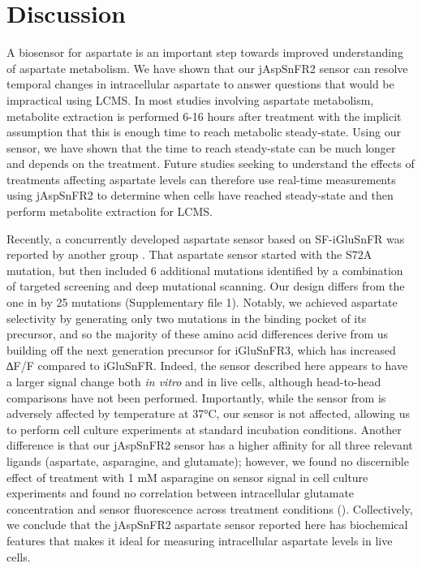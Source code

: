 \documentclass[9pt,lineno]{elife}
\begin{document}
\section{Discussion}
A biosensor for aspartate is an important step towards improved understanding of aspartate metabolism.
We have shown that our jAspSnFR2 sensor can resolve temporal changes in intracellular aspartate to answer questions that would be impractical using LCMS.
In most studies involving aspartate metabolism, metabolite extraction is performed 6-16 hours after treatment with the implicit assumption that this is enough time to reach metabolic steady-state.
Using our sensor, we have shown that the time to reach steady-state can be much longer and depends on the treatment.
Future studies seeking to understand the effects of treatments affecting aspartate levels can therefore use real-time measurements using jAspSnFR2 to determine when cells have reached steady-state and then perform metabolite extraction for LCMS.

Recently, a concurrently developed aspartate sensor based on SF-iGluSnFR was reported by another group \citep{Hellweg2023}.
That aspartate sensor started with the S72A mutation, but then included 6 additional mutations identified by a combination of targeted screening and deep mutational scanning.
Our design differs from the one in \cite{Hellweg2023} by 25 mutations (Supplementary file 1).
Notably, we achieved aspartate selectivity by generating only two mutations in the binding pocket of its precursor, and so the majority of these amino acid differences derive from us building off the next generation precursor for iGluSnFR3, which has increased ∆F/F compared to iGluSnFR.
Indeed, the sensor described here appears to have a larger signal change both \textit{in vitro} and in live cells, although head-to-head comparisons have not been performed.
Importantly, while the sensor from \cite{Hellweg2023} is adversely affected by temperature at 37°C, our sensor is not affected, allowing us to perform cell culture experiments at standard incubation conditions.
Another difference is that our jAspSnFR2 sensor has a higher affinity for all three relevant ligands (aspartate, asparagine, and glutamate); however, we found no discernible effect of treatment with 1 mM asparagine on sensor signal in cell culture experiments and found no correlation between intracellular glutamate concentration and sensor fluorescence across treatment conditions ().
Collectively, we conclude that the jAspSnFR2 aspartate sensor reported here has biochemical features that makes it ideal for measuring intracellular aspartate levels in live cells.
\end{document}
